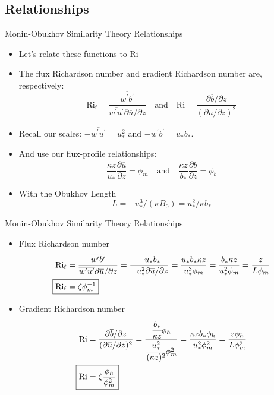\subsection{Relationships}
\begin{frame}{Monin-Obukhov Similarity Theory Relationships}

\begin{itemize}
	\item Let's relate these functions to Ri
	\item The flux Richardson number and gradient Richardson number are, respectively:
	$$\mathrm{Ri_f} = \frac{\overline{w^\prime b^\prime}}{\overline{w^\prime u^\prime}\partial \overline{u}/\partial z} \quad \text{and} \quad \mathrm{Ri} = \frac{\partial \overline{b}/\partial z}{(\partial \overline{u}/\partial z)^2}$$
	\item Recall our scales: $-\overline{w^\prime u^\prime} = u_*^2$ and $-\overline{w^\prime b^\prime} = u_*b_*$.
	\item And use our flux-profile relationships:
	$$\frac{\kappa z}{u_*} \frac{\partial \overline{u}}{\partial z} = \phi_m \quad \text{and} \quad \frac{\kappa z}{b_*} \frac{\partial \overline{b}}{\partial z} = \phi_b$$
	\item With the Obukhov Length
	$$L=-u_*^3/(\kappa B_0) = u_*^2 / \kappa b_*$$
\end{itemize}
\end{frame}
\begin{frame}{Monin-Obukhov Similarity Theory Relationships}

\begin{itemize}
	\item Flux Richardson number
	\begin{align*}
	 \mathrm{Ri_f} &= \frac{\overline{w^\prime b^\prime}}{\overline{w^\prime u^\prime}\partial \overline{u}/\partial z} = \frac{- u_* b_*}{-u_*^2 \partial \overline{u}/\partial z} = \frac{u_* b_* \kappa z}{u_*^3 \phi_m} = \frac{b_* \kappa z}{u_*^2 \phi_m} = \frac{z}{L \phi_m}\\
	 \Aboxed{\mathrm{Ri_f} &= \zeta \phi_m^{-1}}
	 \end{align*}
	 \item Gradient Richardson number
	 \begin{align*}
	 	\mathrm{Ri} &= \frac{\partial \overline{b}/\partial z}{(\partial \overline{u}/\partial z)^2} = \frac{\cfrac{b_*}{\kappa z}\phi_h}{\cfrac{u_*^2}{(\kappa z)^2} \phi_m^2} = \frac{\kappa z b_* \phi_h}{u_*^2 \phi_m^2} = \frac{z\phi_h}{L \phi_m^2}\\
	 	\Aboxed{\mathrm{Ri} &= \zeta \frac{\phi_h}{\phi_m^{2}}}
	 \end{align*}
\end{itemize}
\end{frame}
